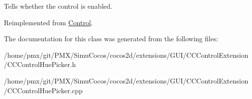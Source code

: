 Tells whether the control is enabled. 

Reimplemented from \hyperlink{classControl_a55339ae920182245d5ec114c33f4b1fd}{Control}.



The documentation for this class was generated from the following files\+:\begin{DoxyCompactItemize}
\item 
/home/pmx/git/\+P\+M\+X/\+Simu\+Cocos/cocos2d/extensions/\+G\+U\+I/\+C\+C\+Control\+Extension/C\+C\+Control\+Hue\+Picker.\+h\item 
/home/pmx/git/\+P\+M\+X/\+Simu\+Cocos/cocos2d/extensions/\+G\+U\+I/\+C\+C\+Control\+Extension/C\+C\+Control\+Hue\+Picker.\+cpp\end{DoxyCompactItemize}
